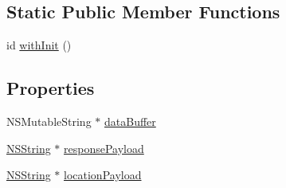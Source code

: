 \subsection*{\-Static \-Public \-Member \-Functions}
\begin{DoxyCompactItemize}
\item 
id \hyperlink{interface_payload_handler_a56bbc7ba0b29185d7e9a31e5b6cc04ce}{with\-Init} ()
\end{DoxyCompactItemize}
\subsection*{\-Properties}
\begin{DoxyCompactItemize}
\item 
\-N\-S\-Mutable\-String $\ast$ \hyperlink{interface_payload_handler_a3d4fd27fea084503a212b0a0da04b6d2}{data\-Buffer}
\item 
\hyperlink{class_n_s_string}{\-N\-S\-String} $\ast$ \hyperlink{interface_payload_handler_a9fceda7756e28f9bf6be362a12446960}{response\-Payload}
\item 
\hyperlink{class_n_s_string}{\-N\-S\-String} $\ast$ \hyperlink{interface_payload_handler_a95790d2ec2ddc1b57ad86baf343ab0da}{location\-Payload}
\end{DoxyCompactItemize}


